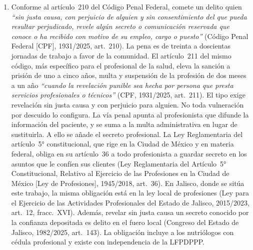 \documentclass[12pt, a4paper]{article}
\begin{document}
\begin{enumerate}[label=\Roman*.]
\item
  Conforme al artículo~210 del Código Penal Federal, comete un delito
  quien \textit{``sin justa causa, con perjuicio de alguien y sin
  consentimiento del que pueda resultar perjudicado, revele algún
  secreto o comunicación reservada que conoce o ha recibido con
  motivo de su empleo, cargo o puesto''} (Código Penal Federal [CPF],
  1931/2025, art.~210). La pena es de treinta a doscientas jornadas
  de trabajo a favor de la comunidad. El artículo~211 del mismo
  código, más específico para el profesional de la salud, eleva la
  sanción a prisión de uno a cinco años, multa y suspensión de la
  profesión de dos meses a un año \textit{``cuando la revelación
  punible sea hecha por persona que presta servicios profesionales o
  técnicos''} (CPF, 1931/2025, art.~211). El tipo exige revelación
  sin justa causa y con perjuicio para alguien. No toda vulneración
  por descuido lo configura. La vía penal apunta al profesionista que
  difunde la información del paciente, y se suma a la multa
  administrativa en lugar de sustituirla. A ello se añade el secreto
  profesional. La Ley Reglamentaria del artículo~5° constitucional,
  que rige en la Ciudad de México y en materia federal, obliga en su
  artículo~36 a todo profesionista a guardar secreto en los asuntos
  que le confíen sus clientes (Ley Reglamentaria del Artículo~5°
  Constitucional, Relativo al Ejercicio de las Profesiones en la
  Ciudad de México [Ley de Profesiones], 1945/2018, art.~36). En Jalisco,
  donde se sitúa este trabajo, la misma obligación está en la ley local de
  profesiones (Ley para el Ejercicio de las Actividades Profesionales del
  Estado de Jalisco, 2015/2023, art.~12, fracc.~XVI). Además, revelar sin
  justa causa un secreto conocido por la confianza depositada es delito en
  el fuero local (Congreso del Estado de Jalisco, 1982/2025, art.~143). La
  obligación incluye a los nutriólogos con cédula
  profesional y existe con independencia de la LFPDPPP.
 

\end{enumerate}
\end{document}

